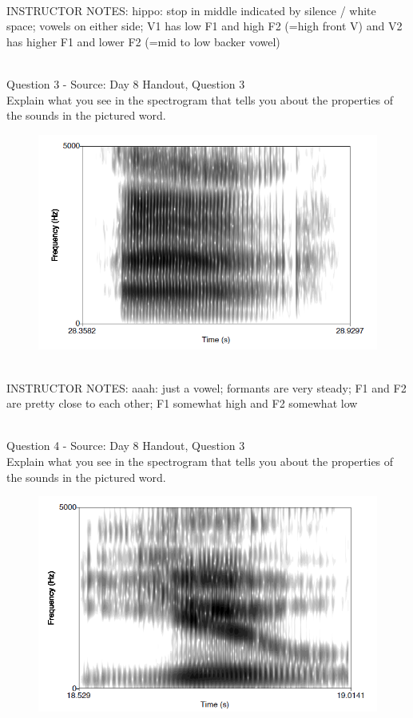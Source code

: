 \documentclass[12pt]{article}
\begin{document}
~\\
INSTRUCTOR NOTES: hippo: stop in middle indicated by silence / white space; vowels on either side; V1 has low F1 and high F2 (=high front V) and V2 has higher F1 and lower F2 (=mid to low backer vowel)


~\\

{\large Question 3} - Source: Day 8 Handout, Question 3\\

Explain what you see in the spectrogram that tells you about the properties of the sounds in the pictured word.\\

\begin{figure}[H]
\includegraphics{../images/spectrogram_aaah.png}
\end{figure}

~\\
INSTRUCTOR NOTES: aaah: just a vowel; formants are very steady; F1 and F2 are pretty close to each other; F1 somewhat high and F2 somewhat low


~\\

{\large Question 4} - Source: Day 8 Handout, Question 3\\

Explain what you see in the spectrogram that tells you about the properties of the sounds in the pictured word.\\

\begin{figure}[H]
\includegraphics{../images/spectrogram_you.png}
\end{figure}
\end{document}
